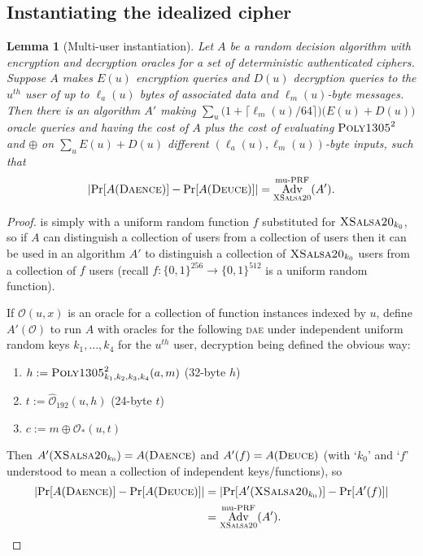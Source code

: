 \documentclass{article}
\newtheorem{lemma}{Lemma}
\def\operatorsc#1{{%
  \ifmmode\let\next=\operatorname\else\let\next=\relax\fi\next{\textsc{#1}}}}
\def\XSalsa#1/{\operatorsc{XSalsa#1}}
\def\Poly#1/{\operatorsc{Poly#1}}
\def\DAENCE/{\operatorsc{Daence}}
\def\DEUCE/{\operatorsc{Deuce}}
\def\muPRF{%
  \ifmmode\def\next{\operatorname{mu-PRF}}%
    \else\def\next/{mu-\textsc{prf}}%
  \fi\next}
\def\DAE{%
  \ifmmode\def\next{\operatorname{DAE}}%
    \else\def\next/{\textsc{dae}}%
  \fi\next}
\DeclareMathOperator{\Adv}{Adv}
\begin{document}
\subsection{Instantiating the idealized cipher}

\begin{lemma}[Multi-user instantiation]\label{mu-instance}
  Let $A$ be a random decision algorithm with encryption and
   decryption oracles for a \emph{set} of deterministic authenticated
   ciphers.
  Suppose $A$ makes $E(u)$ encryption queries and $D(u)$ decryption
   queries to the $u^{\mathit{th}}$ user of up to $\ell_a(u)$ bytes of
   associated data and $\ell_m(u)$-byte messages.
  Then there is an algorithm $A'$ making
   $\sum_u \bigl(1 + \lceil\ell_m(u)/64\rceil\bigr)
     \bigl(E(u) + D(u)\bigr)$
   oracle queries and having the cost of $A$ plus the cost of
   evaluating $\Poly1305/^2$ and $\oplus$ on
   $\sum_u E(u) + D(u)$
   different $(\ell_a(u), \ell_m(u))$-byte inputs,
   such that
  \[
    \lvert\Pr[A(\DAENCE/)] - \Pr[A(\DEUCE/)]\rvert
    = \Adv^{\muPRF}_{\XSalsa20/}(A').
  \]
\end{lemma}

\begin{proof}
  \DEUCE/ is simply \DAENCE/ with a uniform random function $f$
   substituted for $\XSalsa20/_{k_0}$, so if $A$ can distinguish a
   collection of \DAENCE/ users from a collection of \DEUCE/ users then
   it can be used in an algorithm $A'$ to distinguish a collection of
   $\XSalsa20/_{k_0}$ users from a collection of $f$ users (recall
   $f\colon \{0,1\}^{256} \to \{0,1\}^{512}$ is a
   uniform random function).

  If $\mathcal O(u,x)$ is an oracle for a collection of function
   instances indexed by $u$, define $A'(\mathcal O)$ to run $A$ with
   oracles for the following \DAE/ under independent uniform random keys
   $k_1,\dotsc,k_4$ for the $u^{\mathit{th}}$ user, decryption being
   defined the obvious way:
  \begin{enumerate}
    \item $h := \Poly1305/^2_{k_1,k_2,k_3,k_4}(a, m)$
      \hfill (32-byte $h$)
    \item $t := \hat{\mathcal O}_{192}(u, h)$
      \hfill (24-byte $t$)
    \item $c := m \oplus \mathcal O_*(u, t)$
  \end{enumerate}
  Then $A'(\XSalsa20/_{k_0}) = A(\DAENCE/)$ and $A'(f) = A(\DEUCE/)$
   (with `$k_0$' and `$f$' understood to mean a collection of
   independent keys/functions), so
  \begin{align*}
    \lvert\Pr[A(\DAENCE/)] - \Pr[A(\DEUCE/)]\rvert
    &= \lvert\Pr[A'(\XSalsa20/_{k_0})] - \Pr[A'(f)]\rvert \\
    &= \Adv^{\muPRF}_{\XSalsa20/}(A').
    \qedhere
  \end{align*}
\end{proof}

\end{document}
